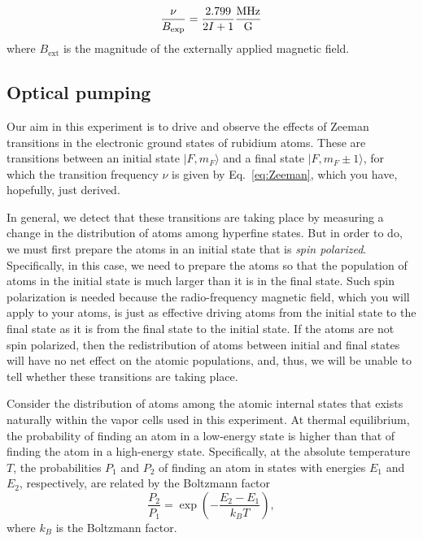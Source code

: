 \documentclass{../lab}
\begin{document}
\begin{enumerate}[series=forstudents,label=Q\arabic*.]
    \begin{equation}
        \frac{\nu}{B_\mathrm{exp}} = \frac{2.799}{2 I + 1} \frac{\text{\normalfont{MHz}}}{\text{\normalfont{G}}}
        \label{eq:Zeeman}
    \end{equation}
    where $B_\mathrm{ext}$ is the magnitude of the externally applied magnetic field.
\end{enumerate}

\subsection{Optical pumping}

Our aim in this experiment is to drive and observe the effects of Zeeman transitions in the electronic ground states of rubidium atoms.  These are transitions between an initial state $|F, m_F\rangle$ and a final state $|F, m_F \pm 1\rangle$, for which the transition frequency $\nu$ is given by Eq.\ \ref{eq:Zeeman}, which you have, hopefully, just derived.


In general, we detect that these transitions are taking place by measuring a change in the distribution of atoms among hyperfine states.  But in order to do, we must first prepare the atoms in an initial state that is \emph{spin polarized}.  Specifically, in this case, we need to prepare the atoms so that the population of atoms in the initial state is much larger than it is in the final state.  Such spin polarization is needed because the radio-frequency magnetic field, which you will apply to your atoms, is just as effective driving atoms from the initial state to the final state as it is from the final state to the initial state.  If the atoms are not spin polarized, then the redistribution of atoms between initial and final states will have no net effect on the atomic populations, and, thus, we will be unable to tell whether these transitions are taking place.

Consider the distribution of atoms among the atomic internal states that exists naturally within the vapor cells used in this experiment.  At thermal equilibrium, the probability of finding an atom in a low-energy state is higher than that of finding the atom in a high-energy state. Specifically, at the absolute temperature $T$, the probabilities $P_1$ and $P_2$ of finding an atom in states with energies $E_1$ and $E_2$, respectively, are related by the Boltzmann factor
    \begin{equation}
        \frac{P_2}{P_1} = \exp\left(-\frac{E_2 - E_1}{k_B T}\right),
    \end{equation}
    where $k_B$ is the Boltzmann factor.
\end{document}
